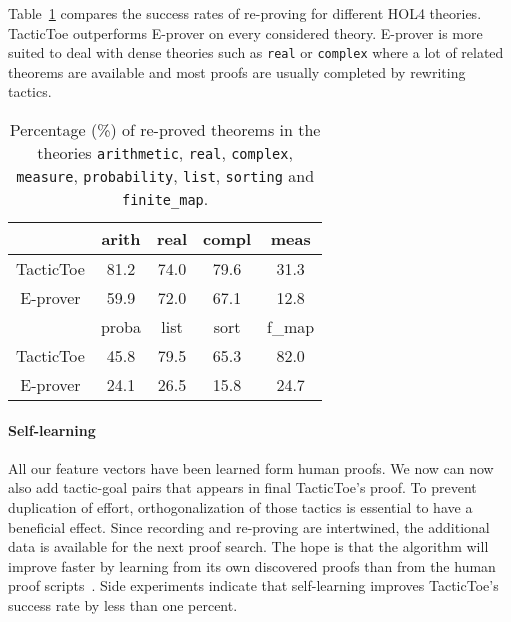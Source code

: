 \documentclass[runningheads,a4paper,draft]{svjour3}
\def\holfour{\textsf{HOL4}\xspace}
\def\eprover{\textsf{E-prover}\xspace}
\def\tactictoe{\textsf{TacticToe}\xspace}
\begin{document}
Table~\ref{theories} compares the success rates of re-proving for different
\holfour theories. \tactictoe outperforms \eprover on every 
considered theory.
\eprover is more suited to deal with dense theories such as 
\texttt{real} or \texttt{complex} where a lot of related theorems are available 
and most proofs are usually completed by rewriting tactics.

\begin{table}[]
\centering
\setlength{\tabcolsep}{3mm}
\begin{tabular}{@{}ccccc@{}}
\toprule
\phantom{ab} & {arith} & {real} & {compl} & {meas} \\
\midrule
\tactictoe & 81.2 & 74.0 & 79.6 & 31.3\\
\eprover & 59.9 & 72.0 & 67.1 & 12.8\\
\midrule
\phantom{abc} & {proba} & {list} & {sort} & {f\_map} \\
\midrule
\tactictoe & 45.8 & 79.5 & 65.3 & 82.0 \\
\eprover & 24.1 & 26.5 & 15.8 & 24.7 \\
\bottomrule
\end{tabular}
\caption{\label{theories}Percentage (\%) of re-proved theorems in the theories 
\texttt{arithmetic}, \texttt{real}, \texttt{complex}, \texttt{measure},  
\texttt{probability}, \texttt{list}, \texttt{sorting} and \texttt{finite\_map}. 
}
\end{table}  




\paragraph{Self-learning}
All our feature vectors have been learned form human proofs. We now can now 
also add tactic-goal pairs that appears in final \tactictoe's proof. To prevent 
duplication of effort, orthogonalization of those 
tactics is essential to have a beneficial effect.
Since recording and re-proving are intertwined, the additional data is 
available for the next proof search.
The hope is that the algorithm will improve faster by learning from its own 
discovered proofs than from the human proof 
scripts~\cite{DBLP:conf/cade/Urban07}. Side experiments indicate that 
self-learning improves \tactictoe's success rate by less than one percent.
\end{document}
